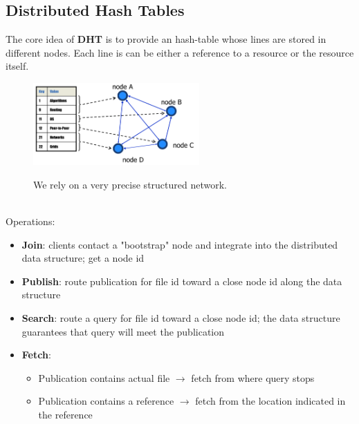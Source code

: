 \documentclass[10pt,a4paper]{article}
\begin{document}
\subsection{Distributed Hash Tables}
The core idea of \textbf{DHT} is to provide an hash-table whose lines are stored in different nodes. Each line is can be either a reference to a resource or the resource itself. 
\begin{figure}[h!]
\hfill \includegraphics[width=180pt]{images/dht.png}\hspace*{\fill}
  \label{fig:dht}
  \caption{We rely on a very precise structured network.}
\end{figure}  \\
Operations:
\begin{itemize}
	\item \textbf{Join}: clients contact a "bootstrap" node and integrate into the distributed data structure; get a node id
	\item \textbf{Publish}: route publication for file id toward a close node id along the data structure
	\item \textbf{Search}: route a query for file id toward a close node id; the data structure guarantees that query will meet the publication
	\item \textbf{Fetch}: 
	\begin{itemize}
		\item Publication contains actual file $\rightarrow$ fetch from where query stops
		\item Publication contains a reference $\rightarrow$ fetch from the location indicated in the reference
	\end{itemize}
\end{itemize}
\end{document}
